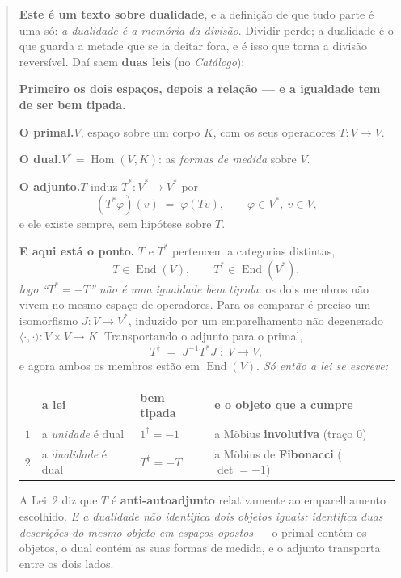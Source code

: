 \documentclass[livro.tex]{subfiles}
\begin{document}
\begin{abstract}
\textbf{Este é um texto sobre dualidade}, e a definição de que tudo parte é uma só:
\emph{a dualidade é a memória da divisão}. Dividir perde; a dualidade é o que guarda a metade que se
ia deitar fora, e é isso que torna a divisão reversível. Daí saem \textbf{duas leis}
(no \emph{Catálogo}):

\medskip
\medskip
\noindent \textbf{Primeiro os dois espaços, depois a relação --- e a igualdade tem de ser bem
tipada.}

\medskip
\noindent\textbf{O primal.}\quad $V$, espaço sobre um corpo $K$, com os seus operadores
$T\colon V\to V$.

\noindent\textbf{O dual.}\quad $V^{*}=\operatorname{Hom}(V,K)$: as \emph{formas de medida} sobre
$V$.

\noindent\textbf{O adjunto.}\quad $T$ induz $T^{*}\colon V^{*}\to V^{*}$ por
\[
  (T^{*}\varphi)(v) \;=\; \varphi(Tv), \qquad \varphi\in V^{*},\ v\in V ,
\]
e ele existe sempre, sem hipótese sobre $T$.

\medskip
\noindent \textbf{E aqui está o ponto.} $T$ e $T^{*}$ pertencem a categorias distintas,
\[
  T\in\operatorname{End}(V), \qquad T^{*}\in\operatorname{End}(V^{*}) ,
\]
\emph{logo ``$T^{*}=-T$'' não é uma igualdade bem tipada}: os dois membros não vivem no mesmo
espaço de operadores. Para os comparar é preciso um isomorfismo $J\colon V\to V^{*}$, induzido por
um emparelhamento não degenerado $\langle\cdot,\cdot\rangle\colon V\times V\to K$. Transportando o
adjunto para o primal,
\[
  T^{\dagger} \;=\; J^{-1}T^{*}J \;\colon\; V\to V ,
\]
e agora ambos os membros estão em $\operatorname{End}(V)$. \emph{Só então a lei se escreve:}

\begin{center}\small
\setlength\tabcolsep{5pt}
\begin{tabular}{@{}llll@{}}
\toprule
 & \textbf{a lei} & \textbf{bem tipada} & \textbf{e o objeto que a cumpre} \\
\midrule
$1$ & a \emph{unidade} é dual   & $1^{\dagger}=-1$ & a Möbius \textbf{involutiva} (traço $0$) \\
$2$ & a \emph{dualidade} é dual & $T^{\dagger}=-T$ & a Möbius de \textbf{Fibonacci} ($\det=-1$) \\
\bottomrule
\end{tabular}
\end{center}

\noindent A Lei~$2$ diz que $T$ é \textbf{anti-autoadjunto} relativamente ao emparelhamento
escolhido. \emph{E a dualidade não identifica dois objetos iguais: identifica duas descrições do
mesmo objeto em espaços opostos} --- o primal contém os objetos, o dual contém as suas formas de
medida, e o adjunto transporta entre os dois lados.



\end{abstract}
\end{document}
